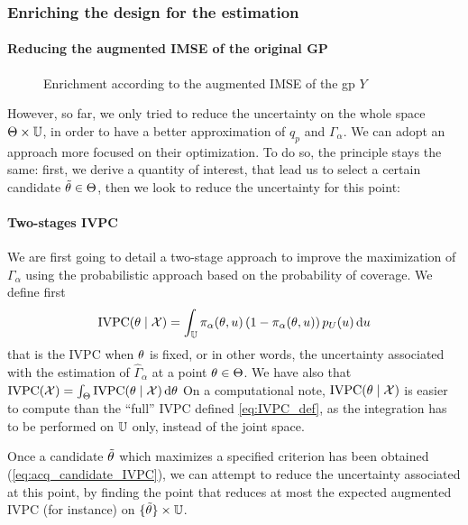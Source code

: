 \documentclass[../../Main_ManuscritThese.tex]{subfiles}
\newcommand\imgpath{/home/victor/acadwriting/Manuscrit/Text/Chapter4/img/}
\begin{document}
\subsubsection{Enriching the design for the estimation}
\paragraph{Reducing the augmented IMSE of the original GP}

\begin{figure}[ht]
  \centering
  
  \caption{\label{fig:IMSE_enrichment_alpha} Enrichment according to the augmented IMSE of the gp $Y$}
\end{figure}

However, so far, we only tried to reduce the uncertainty on the whole space $\Theta \times \mathbb{U}$, in order to have a better approximation of $q_p$ and $\Gamma_{\alpha}$. We can adopt an approach more focused on their optimization. To do so, the principle stays the same: first, we derive a quantity of interest, that lead us to select a certain candidate $\tilde{\theta} \in \Theta$, then we look to reduce the uncertainty for this point:

\paragraph{Two-stages IVPC}
We are first going to detail a two-stage approach to improve the maximization of $\Gamma_\alpha$ using the probabilistic approach based on the probability of coverage.
We define first 
\begin{equation}
  \mathrm{IVPC}(\theta\mid \mathcal{X}) = \int_{\mathbb{U}} \pi_{\alpha}(\theta, u)\left(1 - \pi_{\alpha}(\theta, u)\right)p_{U}(u)\, \mathrm{d}u
\end{equation}
that is the $\mathrm{IVPC}$ when $\theta$ is fixed, or in other words, the uncertainty associated with the estimation of $\hat{\Gamma}_{\alpha}$ at a point $\theta \in \Theta$. We have also that $\mathrm{IVPC}(\mathcal{X}) = \int_{\Theta} \mathrm{IVPC}(\theta \mid \mathcal{X}) \,\mathrm{d}\theta$
On a computational note,  $\mathrm{IVPC}(\theta\mid \mathcal{X})$ is easier to compute than the ``full'' $\mathrm{IVPC}$ defined \cref{eq:IVPC_def}, as the integration has to be performed on $\mathbb{U}$ only, instead of the joint space.


Once a candidate $\tilde{\theta}$  which maximizes a specified criterion has been obtained (\cref{eq:acq_candidate_IVPC}), we can attempt to reduce the uncertainty associated at this point, by finding the point that reduces at most the expected augmented IVPC (for instance) on $\{\tilde{\theta}\}\times \mathbb{U}$.
\end{document}
